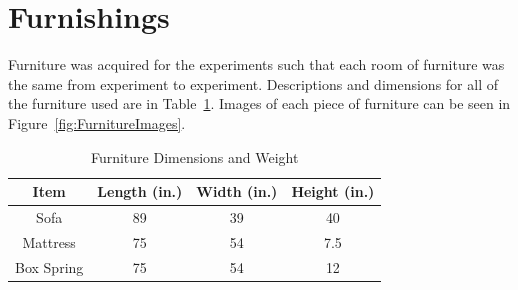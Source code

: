 \documentclass[12pt,oneside]{book}
\begin{document}
\section*{Furnishings}

Furniture was acquired for the experiments such that each room of furniture was the same from experiment to experiment. Descriptions and dimensions for all of the furniture used are in Table~\ref{FurnitureTable}. Images of each piece of furniture can be seen in Figure~\ref{fig:FurnitureImages}.

\renewcommand{\arraystretch}{1.5}
\begin{table}[H]
	\centering
	\caption{Furniture Dimensions and Weight}
		\begin{tabular}[c]{|c|c|c|c|}
			\hline
			\textbf{Item} & \textbf{Length (in.)} & \textbf{Width (in.)} & \textbf{Height (in.)} \\ \hline \hline
			Sofa & 89 & 39 & 40 \\ \hline
			Mattress & 75 & 54 & 7.5 \\ \hline
			Box Spring & 75 & 54 & 12 \\ \hline
		\end{tabular}
	\label{FurnitureTable}
\end{table}

\end{document}
